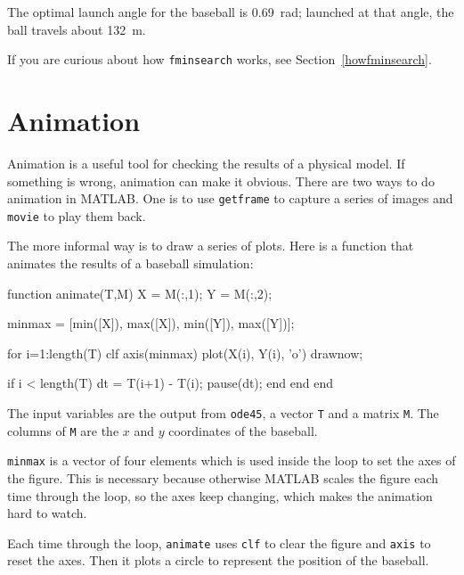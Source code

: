 The optimal launch angle for the baseball is \SI{0.69}{\radian}; launched at that angle, the ball travels about \SI{132}{\meter}.

If you are curious about how {\tt fminsearch} works, see Section~\ref{howfminsearch}.


\section{Animation}

Animation is a useful tool for checking the results of a physical
model.  If something is wrong, animation can make it obvious.
There are two ways to do animation in MATLAB.  One is to use
{\tt getframe} to capture a series of images and {\tt movie} to
play them back.


The more informal way is to draw a series of plots.  Here is a function that animates the results of a baseball simulation:

\begin{code}
function animate(T,M)
    X = M(:,1);
    Y = M(:,2);

    minmax = [min([X]), max([X]), min([Y]), max([Y])];

    for i=1:length(T)
        clf
        axis(minmax)
        plot(X(i), Y(i), 'o')
        drawnow;
        
        if i < length(T)
            dt = T(i+1) - T(i);
            pause(dt);
        end
    end
end
\end{code}

The input variables are the output from {\tt ode45}, a vector
{\tt T} and a matrix {\tt M}.  The columns of {\tt M} are the
$x$ and $y$ coordinates of the baseball.


{\tt minmax} is a vector of four elements which is used inside
the loop to set the axes of the figure.  This is necessary because
otherwise MATLAB scales the figure each time through the loop,
so the axes keep changing, which makes the animation hard
to watch.


Each time through the loop, {\tt animate} uses {\tt clf}
to clear the figure and {\tt axis} to reset the axes.  Then it plots a circle to represent the position of the baseball.


